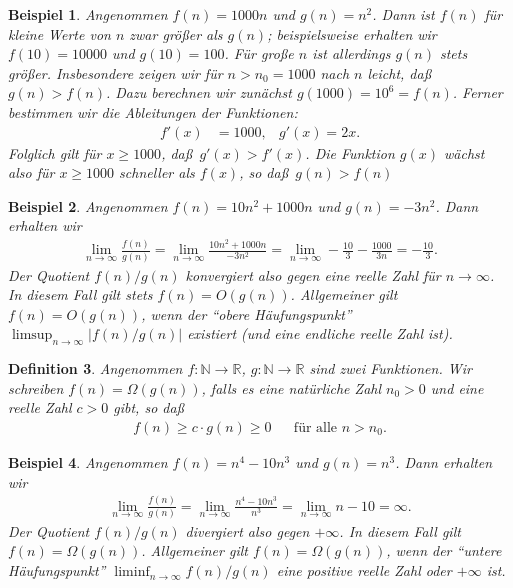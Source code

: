 \documentclass[10pt,reqno]{amsart}
\numberwithin{equation}{section}
\newcommand\NN{\mathbb N}
\newcommand\RR{\mathbb R}
\newtheorem{definition}{Definition}[section]
\newtheorem{example}[definition]{Beispiel}
\begin{document}
\begin{example}\upshape
Angenommen $f(n)=1000n$ und $g(n)=n^2$.
Dann ist $f(n)$ f\"ur kleine Werte von $n$ zwar gr\"o\ss er als $g(n)$; beispielsweise erhalten wir $f(10)=10000$ und $g(10)=100$.
F\"ur gro\ss e $n$ ist allerdings $g(n)$ stets gr\"o\ss er.
Insbesondere zeigen wir f\"ur $n>n_0=1000$ nach $n$ leicht, da\ss\ $g(n)>f(n)$.
Dazu berechnen wir zun\"achst $g(1000)=10^6=f(n)$.
Ferner bestimmen wir die Ableitungen der Funktionen:
\begin{align*}
	f'(x)&=1000,&g'(x)=2x.
\end{align*}
Folglich gilt f\"ur $x\geq1000$, da\ss\ $g'(x)>f'(x)$.
Die Funktion $g(x)$ w\"achst also f\"ur $x\geq1000$ schneller als $f(x)$, so da\ss\ $g(n)>f(n)$ 
\end{example}

\begin{example}\upshape
Angenommen $f(n)=10n^2+1000n$ und $g(n)=-3n^2$.
Dann erhalten wir
\begin{align*}
	\lim_{n\to\infty}\frac{f(n)}{g(n)}=\lim_{n\to\infty}\frac{10n^2+1000n}{-3n^2}=\lim_{n\to\infty}-\frac{10}3-\frac{1000}{3n}=-\frac{10}3.
\end{align*}
Der Quotient $f(n)/g(n)$ konvergiert also gegen eine reelle Zahl f\"ur $n\to\infty$.
In diesem Fall gilt stets $f(n)=O(g(n))$.
Allgemeiner gilt $f(n)=O(g(n))$, wenn der ``obere H\"aufungspunkt'' $\limsup_{n\to\infty}|f(n)/g(n)|$ existiert (und eine endliche reelle Zahl ist).
\end{example}

\begin{definition}\label{def_Omega}
	Angenommen $f:\NN\to\RR$, $g:\NN\to\RR$ sind zwei Funktionen.
	Wir schreiben $f(n)=\Omega(g(n))$, falls es eine nat\"urliche Zahl $n_0>0$ und eine reelle Zahl $c>0$ gibt, so da\ss
	\begin{align*}
		f(n)\geq c\cdot g(n)\geq0&&\mbox{f\"ur alle }n>n_0.
	\end{align*}
\end{definition}

\begin{example}\upshape
Angenommen $f(n)=n^4-10n^3$ und $g(n)=n^3$.
Dann erhalten wir
\begin{align*}
	\lim_{n\to\infty}\frac{f(n)}{g(n)}=\lim_{n\to\infty}\frac{n^4-10n^3}{n^3}=\lim_{n\to\infty}n-10=\infty.
\end{align*}
Der Quotient $f(n)/g(n)$ divergiert also gegen $+\infty$.
In diesem Fall gilt $f(n)=\Omega(g(n))$.
Allgemeiner gilt $f(n)=\Omega(g(n))$, wenn der ``untere H\"aufungspunkt'' $\liminf_{n\to\infty}f(n)/g(n)$ eine positive reelle Zahl oder $+\infty$ ist.
\end{example}
\end{document}
